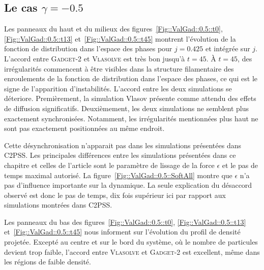 		\label{Sec::VlaGad::Res}
		\subsection{Le cas $\gamma = -0.5$}

		Les panneaux du haut et du milieux des figures~\ref{Fig::ValGad::0.5::t0}, \ref{Fig::ValGad::0.5::t13} et~\ref{Fig::ValGad::0.5::t45} montrent l'évolution de la fonction de distribution dans l'espace des
		phases pour $j=0.425$ et intégrée sur $j$. L'accord entre \textsc{Gadget-2} et \textsc{Vlasolve}
		est très bon jusqu'à $t=45$. À $t=45$, des irrégularités commencent à être visibles dans la structure filamentaire des enroulements de la fonction de distribution dans
		l'espace des phases, ce qui est le signe de l'apparition d'instabilités.
		L'accord entre les deux simulations se déteriore.
		Premièrement, la simulation Vlasov présente comme attendu des effets de diffusion significatifs.
		Deuxièmement, les deux simulations ne semblent plus exactement synchronisées. Notamment, les irrégularités mentionnées plus haut ne sont pas exactement positionnées
		au même endroit.

		Cette désynchronisation n'apparait pas dans les simulations présentées
		dans C2PSS. Les principales différences entre les simulations présentées dans ce chapitre et celles de l'article sont le paramètre de lissage de la force $\epsilon$ et le pas de temps
		maximal autorisé. La figure~\ref{Fig::ValGad::0.5::SoftAll} montre que $\epsilon$ n'a pas d'influence importante sur la dynamique.
		La seule explication du désaccord observé
		est donc le pas de temps, dix fois supérieur ici par rapport aux simulations montrées dans C2PSS.

		Les panneaux du bas des figures~\ref{Fig::ValGad::0.5::t0}, \ref{Fig::ValGad::0.5::t13} et~\ref{Fig::ValGad::0.5::t45} nous
		informent sur l'évolution du profil de densité projetée. Excepté au centre et sur le bord du système, où le nombre de particules devient trop
		faible, l'accord entre \textsc{Vlasolve} et \textsc{Gadget-2} est excellent, même dans les régions de faible densité.

			

